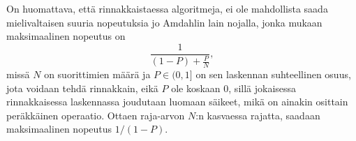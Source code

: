 \documentclass[finnish]{tktltiki2}
\theoremstyle{definition}
\theoremstyle{remark}
\begin{document}
On huomattava, että rinnakkaistaessa algoritmeja, ei ole mahdollista saada mielivaltaisen suuria nopeutuksia jo Amdahlin lain nojalla, jonka mukaan maksimaalinen nopeutus on
\[
\frac{1}{(1 - P) + \frac{P}{N}},
\]
missä $N$ on suorittimien määrä ja $P \in (0, 1]$ on sen laskennan suhteellinen osuus, jota voidaan tehdä rinnakkain, eikä $P$ ole koskaan 0, sillä jokaisessa rinnakkaisessa laskennassa joudutaan luomaan säikeet, mikä on ainakin osittain peräkkäinen operaatio. Ottaen raja-arvon $N$:n kasvaessa rajatta, saadaan maksimaalinen nopeutus $1 / (1 - P)$.







% 
\end{document}
